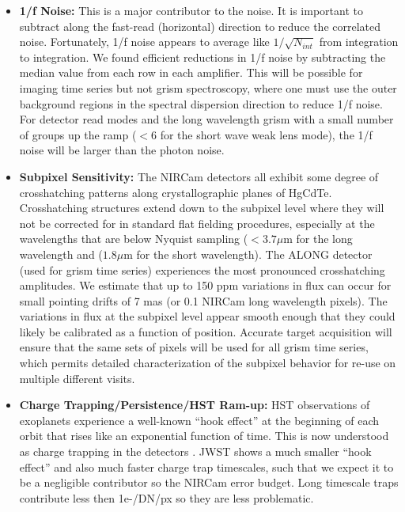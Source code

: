 \documentclass{aastex62}
\begin{document}
\begin{itemize}
	\item \textbf{1/f Noise:} This is a major contributor to the noise.
	It is important to subtract along the fast-read (horizontal) direction to reduce the correlated noise.
	Fortunately, 1/f noise appears to average like $1/\sqrt{N_{int}} $ from integration to integration.
	We found efficient reductions in 1/f noise by subtracting the median value from each row in each amplifier.
	This will be possible for imaging time series but not grism spectroscopy, where one must use the outer background regions in the spectral dispersion direction to reduce 1/f noise.
	For detector read modes and the long wavelength grism with a small number of groups up the ramp ($<6$ for the short wave weak lens mode), the 1/f noise will be larger than the photon noise.
	\item \textbf{Subpixel Sensitivity:} The NIRCam detectors all exhibit some degree of crosshatching patterns along crystallographic planes of HgCdTe.
	Crosshatching structures extend down to the subpixel level where they will not be corrected for in standard flat fielding procedures, especially at the wavelengths that are below Nyquist sampling ($< 3.7\mu$m for the long wavelength and ($1.8\mu$m for the short wavelength).
	The ALONG detector (used for grism time series) experiences the most pronounced crosshatching amplitudes.
	We estimate that up to 150 ppm variations in flux can occur for small pointing drifts of 7 mas (or 0.1 NIRCam long wavelength pixels).
	The variations in flux at the subpixel level appear smooth enough that they could likely be calibrated as a function of position.
	Accurate target acquisition will ensure that the same sets of pixels will be used for all grism time series, which permits detailed characterization of the subpixel behavior for re-use on multiple different visits.
	\item \textbf{Charge Trapping/Persistence/HST Ram-up:} HST observations of exoplanets experience a well-known ``hook effect'' at the beginning of each orbit that rises like an exponential function of time.
	This is now understood as charge trapping in the detectors \citep{zhou2017chargeTrap}.
	JWST shows a much smaller ``hook effect'' and also much faster charge trap timescales, such that we expect it to be a negligible contributor so the NIRCam error budget.
	Long timescale traps contribute less then 1e-/DN/px so they are less problematic.
\end{itemize}
\end{document}
